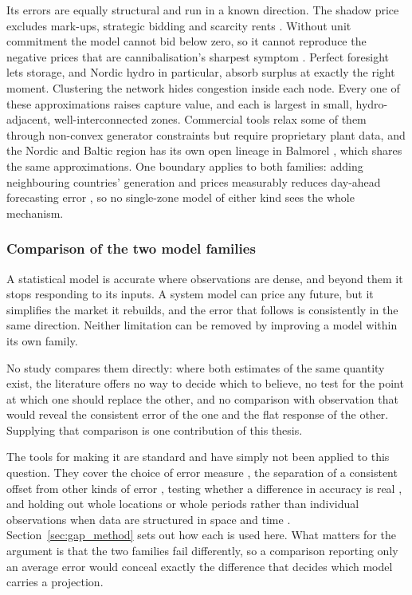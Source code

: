 Its errors are equally structural and run in a known direction. The shadow price
excludes mark-ups, strategic bidding and scarcity rents \cite{Mays2023}. Without
unit commitment the model cannot bid below zero, so it cannot reproduce the
negative prices that are cannibalisation's sharpest symptom \cite{Ruhnau2023}.
Perfect foresight lets storage, and Nordic hydro in particular, absorb surplus at
exactly the right moment. Clustering the network hides congestion inside each
node. Every one of these approximations raises capture value, and each is
largest in small, hydro-adjacent, well-interconnected zones. Commercial tools
relax some of them through non-convex generator constraints
\cite{PLEXOS2024, Mendes2024} but require proprietary plant data, and the Nordic
and Baltic region has its own open lineage in Balmorel \cite{Wiese2018}, which
shares the same approximations. One boundary applies to both families: adding
neighbouring countries' generation and prices measurably reduces day-ahead
forecasting error \cite{VanDerHeijden2021}, so no single-zone model of either
kind sees the whole mechanism.

\subsubsection{Comparison of the two model families}

A statistical model is accurate
where observations are dense, and beyond them it stops responding to its inputs.
A system model can price any future, but it simplifies the market it rebuilds,
and the error that follows is consistently in the same direction. Neither
limitation can be removed by improving a model within its own family.

No study compares them directly: where both estimates of the same quantity
exist, the literature offers no way to decide which to believe, no test for the
point at which one should replace the other, and no comparison with observation
that would reveal the consistent error of the one and the flat response of the
other. Supplying that comparison is one contribution of this thesis.

The tools for making it are standard and have simply not been applied to this
question. They cover the choice of error measure \cite{HyndmanKoehler2006}, the
separation of a consistent offset from other kinds of error \cite{Theil1966},
testing whether a difference in accuracy is real \cite{DieboldMariano1995}, and
holding out whole locations or whole periods rather than individual observations
when data are structured in space and time \cite{Roberts2017}.
Section~\ref{sec:gap_method} sets out how each is used here. What matters for the
argument is that the two families fail differently, so a comparison reporting
only an average error would conceal exactly the difference that decides which
model carries a projection.

